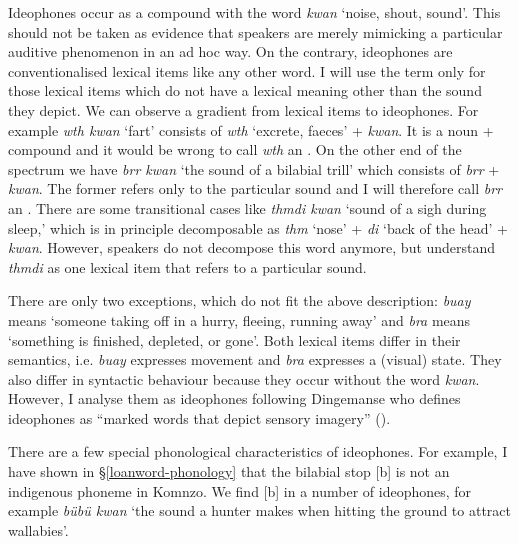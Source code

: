 Ideophones occur as a compound with the word \emph{kwan} `noise, shout, sound'. This should not be taken as evidence that speakers are merely mimicking a particular auditive phenomenon in an ad hoc way. On the contrary, ideophones are conventionalised lexical items like any other word. I will use the term  only for those lexical items which do not have a lexical meaning other than the sound they depict. We can observe a gradient from lexical items to ideophones. For example \emph{wth kwan} `fart' consists of \emph{wth} `excrete, faeces' + \emph{kwan}. It is a noun +  compound and it would be wrong to call \emph{wth} an . On the other end of the spectrum we have \emph{brr kwan} `the sound of a bilabial trill' which consists of \emph{brr} + \emph{kwan}. The former refers only to the particular sound and I will therefore call \emph{brr} an . There are some transitional cases like \emph{thmdi kwan} `sound of a sigh during sleep,' which is in principle decomposable as \emph{thm} `nose' + \emph{di} `back of the head' + \emph{kwan}. However, speakers do not decompose this word anymore, but understand \emph{thmdi} as one lexical item that refers to a particular sound.%

There are only two exceptions, which do not fit the above description: \emph{buay} means `someone taking off in a hurry, fleeing, running away' and \emph{bra} means `something is finished, depleted, or gone'. Both lexical items differ in their semantics, i.e. \emph{buay} expresses movement and \emph{bra} expresses a (visual) state. They also differ in syntactic behaviour because they occur without the word \emph{kwan}. However, I analyse them as ideophones following Dingemanse who defines ideophones as ``marked words that depict sensory imagery'' (\citeyear[655]{Dingemanse:2012fc}).%

There are a few special phonological characteristics of ideophones. For example, I have shown in \S{}\ref{loanword-phonology} that the bilabial stop [b] is not an indigenous phoneme in Komnzo. We find [b] in a number of ideophones, for example \emph{bübü kwan} `the sound a hunter makes when hitting the ground to attract wallabies'.


